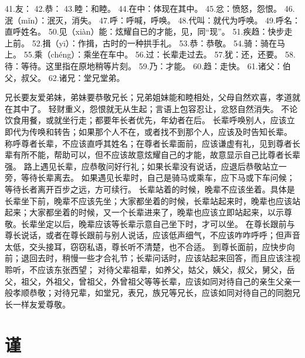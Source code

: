 \documentclass[a4paper,12pt,UTF8,twoside]{ctexbook}
\begin{document}
41.友：
42.恭：
43.睦：和睦。
44.在中：体现在其中。
45.忿：愤怒，怨恨。
46.泯（mǐn）：泯灭，消失。
47.呼：呼喊，呼唤。
48.代叫：就代为呼唤。
49.呼名：直呼姓名。
50.见（xiàn）能：炫耀自已的才能，见，同“现”。
51.疾趋：快步走上前。
52.揖（yī）：作揖，古时的一种拱手礼。
53.恭：恭敬。
54.骑：骑在马上。
55.乘（chéng）：乘坐在车中。
56.过：长辈走过去。
57.犹：还，还要。
58.待：等待。这里指在原地稍等片刻。
59.乃：才能。
60.趋：走快。
61.诸父：伯父，叔父。
62.诸兄：堂兄堂弟。


兄长要友爱弟妹，弟妹要恭敬兄长；兄弟姐妹能和睦相处，父母自然欢喜，孝道就在其中了。
轻财重义，怨恨就无从生起；言语上包容忍让，忿怒自然消失。
不论饮食用餐，或就坐行走；都要年长者优先，年幼者在后。
长辈呼唤别人，应该立即代为传唤和转告；如果那个人不在，或者找不到那个人，应该及时告知长辈。
称呼尊者长辈，不应该直呼其姓名；在尊者长辈面前，应该谦虚有礼，见到尊者长辈有所不能，帮助可以，但不应该故意炫耀自己的才能，故意显示自己比尊者长辈强。
路上遇见长辈，应恭敬问好行礼；如果长辈没有说话，应退后恭敬站立一旁，等待长辈离去。
如果遇见长辈时，自己是骑马或乘车，应下马或下车问候；等待长者离开百步之远，方可续行。
长辈站着的时候，晚辈不应该坐着。具体是长辈坐下前，晚辈不应该先坐；大家都坐着的时候，长辈站起来时，晚辈也应该站起来；大家都坐着的时候，又一个长辈进来了，晚辈也应该立即站起来，以示尊敬。长辈坐定以后，晚辈应该等长辈示意自己坐下时，才可以坐。
在尊长跟前与尊长说话，或者在尊长跟前与别人说话，应该低声细气，不应该咋咋呼呼；但声音太低，交头接耳，窃窃私语，尊长听不清楚，也不合适。
到尊长面前，应快步向前；退回去时，稍慢一些才合礼节；长辈问话时，应该站起来回答，而且应该注视聆听，不应该东张西望；
对待父辈祖辈，如养父，姑父，姨父，叔父，舅父，岳父，祖父，外祖父，曾祖父，外曾祖父等等长辈，应该如同对待自己的亲生父亲一般孝顺恭敬；对待兄辈，如堂兄，表兄，族兄等兄长，应该如同对待自己的同胞兄长一样友爱尊敬。

\chapter{谨}
\end{document}
